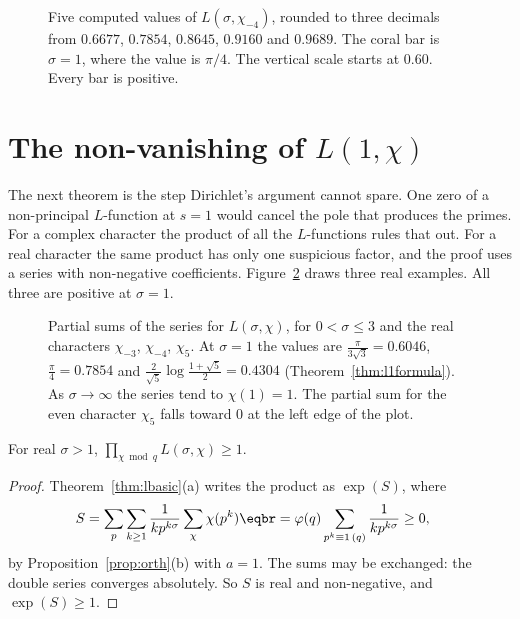 \begin{figure}[ht]
\centering
{}
\caption{Five computed values of $L(\sigma,\chi_{-4})$, rounded to three decimals from $0.6677$, $0.7854$, $0.8645$, $0.9160$ and $0.9689$. The coral bar is $\sigma=1$, where the value is $\pi/4$. The vertical scale starts at $0.60$. Every bar is positive.}
\label{fig:lsigmachi4}
\end{figure}

\section{The non-vanishing of \texorpdfstring{$L(1,\chi)$}{L(1,chi)}}\label{sec:siegel}

The next theorem is the step Dirichlet's argument cannot spare. One zero of a non-principal $L$-function at $s=1$ would cancel the pole that produces the primes. For a complex character the product of all the $L$-functions rules that out. For a real character the same product has only one suspicious factor, and the proof uses a series with non-negative coefficients. Figure~\ref{fig:lreal} draws three real examples. All three are positive at $\sigma=1$.

\begin{figure}[ht]
\centering
{}
\caption{Partial sums of the series for $L(\sigma,\chi)$, for $0<\sigma\le3$ and the real characters $\chi_{-3}$, $\chi_{-4}$, $\chi_5$. At $\sigma=1$ the values are $\frac\pi{3\sqrt3}=0.6046$, $\frac\pi4=0.7854$ and
$\frac2{\sqrt5}\log\frac{1+\sqrt5}2=0.4304$ (Theorem~\ref{thm:l1formula}). As $\sigma\to\infty$ the series tend to $\chi(1)=1$. The partial sum for the even character $\chi_5$ falls toward $0$ at the left edge of the plot.}
\label{fig:lreal}
\end{figure}

\begin{lemma}\label{lem:prodchars}
For real $\sigma>1$, $\prod_{\chi\bmod q}L(\sigma,\chi)\ge1$.
\end{lemma}
\begin{proof}
Theorem~\ref{thm:lbasic}(a) writes the product as $\exp(S)$, where
\[
\begin{aligned}S&=\sum_p\sum_{k\ge1}\frac1{kp^{k\sigma}}\sum_\chi\chi(p^k)\eqbr=\varphi(q)\sum_{p^k\equiv1\,(q)}\frac1{kp^{k\sigma}}\ge0,\end{aligned}
\]
by Proposition~\ref{prop:orth}(b) with $a=1$. The sums may be exchanged: the double series converges absolutely. So $S$ is real and non-negative, and $\exp(S)\ge1$.
\end{proof}

